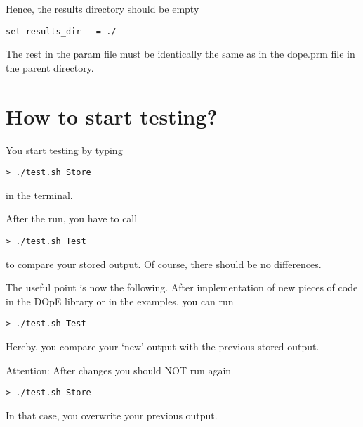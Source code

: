 Hence, the results directory should be empty
\begin{verbatim}
set results_dir   = ./
\end{verbatim}
The rest in the param file must be identically the same as 
in the dope.prm file in the parent directory. 

\section{How to start testing?}
You start testing by typing 
\begin{verbatim}
> ./test.sh Store
\end{verbatim}
in the terminal.

After the run, you have to call 
\begin{verbatim}
> ./test.sh Test
\end{verbatim}
to compare your stored output. Of course, there should be no differences.

The useful point is now the following. After implementation of 
new pieces of code in the DOpE library or in the examples, you can
run 
\begin{verbatim}
> ./test.sh Test
\end{verbatim}
Hereby, you compare your `new' output with the previous stored output.

Attention: After changes you should NOT run again
\begin{verbatim}
> ./test.sh Store
\end{verbatim}
In that case, you overwrite your previous output.
